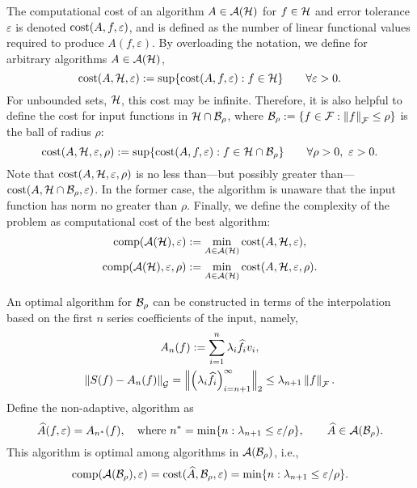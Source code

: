 \documentclass[final]{elsarticle}
\theoremstyle{definition}
\theoremstyle{remark}
\newcommand{\optAn}{A_n}
\begin{document}
The computational cost of an algorithm $A \in \ca(\ch)$ for $f \in \ch$ and error tolerance $\varepsilon$ is denoted $\cost(A,f,\varepsilon)$, and is defined as the number of linear functional values required to produce $A(f,\varepsilon)$.  By overloading the notation, we define for arbitrary algorithms $A \in \ca(\ch)$, 
\begin{equation*}
\cost(A,\ch,\varepsilon) : = \sup \{\cost(A,f,\varepsilon) : f \in \ch \} \qquad \forall \varepsilon > 0.
\end{equation*}
For unbounded sets, $\ch$, this cost may be infinite.  Therefore, it is also helpful to define the cost for input functions in $\ch \cap \cb_{\rho}$, where $\cb_{\rho} : = \{ f \in \cf : \norm[\cf]{f} \le \rho \}$ is the ball of radius $\rho$:
\begin{equation*}
\cost(A,\ch,\varepsilon,\rho) : = \sup \{\cost(A,f,\varepsilon) : f \in \ch \cap \cb_{\rho} \} \qquad \forall \rho > 0, \ \varepsilon > 0.
\end{equation*}
Note that $\cost(A,\ch,\varepsilon,\rho)$ is no less than---but possibly greater than---$\cost(A,\ch \cap \cb_{\rho},\varepsilon)$.  In the former case, the algorithm is unaware  that the input function has norm no greater than $\rho$.  
Finally, we define the complexity of the problem as computational cost of the best algorithm:
\begin{gather*}
\comp(\ca(\ch),\varepsilon) := \min_{A \in \ca(\ch)} \cost(A, \ch, \varepsilon), \\
\comp(\ca(\ch),\varepsilon,\rho) := \min_{A \in \ca(\ch)} \cost(A, \ch, \varepsilon, \rho).
\end{gather*}

An optimal algorithm for $\cb_{\rho}$ can be constructed in terms of the interpolation based on the first $n$ series coefficients of the input, namely,
\begin{gather}  \label{optAdef}
\optAn(f) := \sum_{i=1}^n \lambda_{i} \hf_{i} v_{i}, \\
\label{errOpt}
\norm[\cg]{S(f) - \optAn(f)} = \Bignorm[2]{\left(\lambda_{i} \hf_{i} \right)_{i= n+1}^{\infty}} \le \lambda_{n+1} \norm[\cf]{f}.
\end{gather}
Define the non-adaptive, algorithm as
\begin{equation} \label{optBallalg}
\hA(f,\varepsilon) = A_{n^*}(f), \quad \text{where } n^* = \min\{ n : \lambda_{n+1} \le \varepsilon/\rho \}, \qquad \hA \in \ca(\cb_{\rho}).
\end{equation}
This algorithm is optimal among algorithms in $\ca(\cb_{\rho})$, i.e.,
\[
\comp(\ca(\cb_{\rho}),\varepsilon) = \cost(\hA,\cb_{\rho},\varepsilon) =
\min\{ n : \lambda_{n+1} \le \varepsilon/\rho \}.
\]
\end{document}
